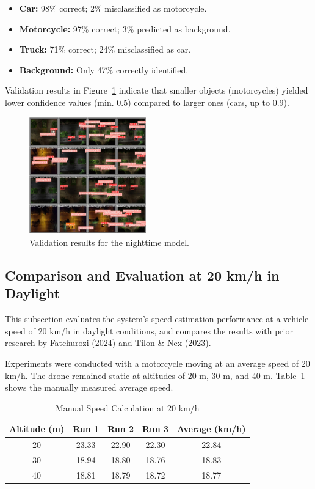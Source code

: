 \begin{itemize}
    \item \textbf{Car:} 98\% correct; 2\% misclassified as motorcycle.
    \item \textbf{Motorcycle:} 97\% correct; 3\% predicted as background.
    \item \textbf{Truck:} 71\% correct; 24\% misclassified as car.
    \item \textbf{Background:} Only 47\% correctly identified.
\end{itemize}

Validation results in Figure~\ref{fig:validasi_malam} indicate that smaller objects (motorcycles) yielded lower confidence values (min. 0.5) compared to larger ones (cars, up to 0.9).

\begin{figure}[H]
\centering
\includegraphics[width=0.45\textwidth]{gambar/val_batch_malam.jpg}
\caption{Validation results for the nighttime model.}
\label{fig:validasi_malam}
\end{figure}

\subsection{Comparison and Evaluation at 20 km/h in Daylight}

This subsection evaluates the system's speed estimation performance at a vehicle speed of 20 km/h in daylight conditions, and compares the results with prior research by Fatchurozi (2024) and Tilon \& Nex (2023).

Experiments were conducted with a motorcycle moving at an average speed of 20 km/h. The drone remained static at altitudes of 20 m, 30 m, and 40 m. Table~\ref{table:manual_speed_calc} shows the manually measured average speed.

\begin{table}[htbp]
\centering
\caption{Manual Speed Calculation at 20 km/h}
\label{table:manual_speed_calc}
\begin{tabular}{|c|c|c|c|c|}
\hline
\textbf{Altitude (m)} & Run 1 & Run 2 & Run 3 & \textbf{Average (km/h)} \\ \hline
20 & 23.33 & 22.90 & 22.30 & 22.84 \\ \hline
30 & 18.94 & 18.80 & 18.76 & 18.83 \\ \hline
40 & 18.81 & 18.79 & 18.72 & 18.77 \\ \hline
\end{tabular}
\end{table}

